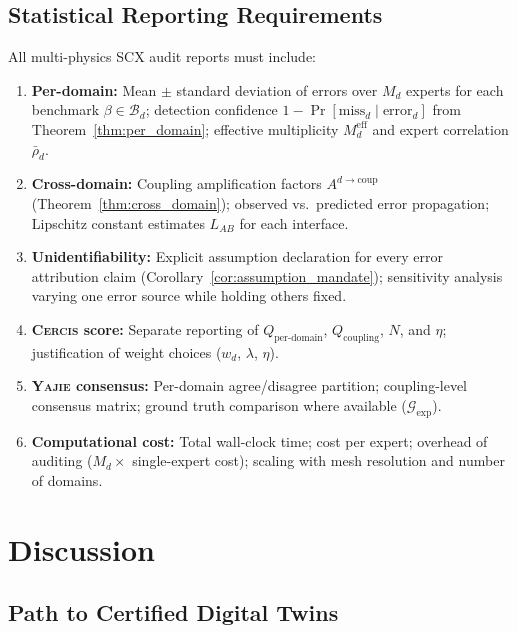 \documentclass[11pt,a4paper]{article}
\theoremstyle{definition}
\newcommand{\Yajie}{\textsc{Yajie}}
\newcommand{\Cercis}{\textsc{Cercis}}
\begin{document}
\subsection{Statistical Reporting Requirements }

All multi-physics SCX audit reports must include:

\begin{enumerate}[label=(\arabic*)]
    \item \textbf{Per-domain:} Mean $\pm$ standard deviation of errors over $M_d$ experts for each benchmark $\beta \in \mathcal{B}_d$; detection confidence $1 - \Pr[\text{miss}_d \mid \text{error}_d]$ from Theorem~\ref{thm:per_domain}; effective multiplicity $M_d^{\mathrm{eff}}$ and expert correlation $\bar{\rho}_d$.
    \item \textbf{Cross-domain:} Coupling amplification factors $A^{d \to \mathrm{coup}}$ (Theorem~\ref{thm:cross_domain}); observed vs.\ predicted error propagation; Lipschitz constant estimates $L_{AB}$ for each interface.
    \item \textbf{Unidentifiability:} Explicit assumption declaration for every error attribution claim (Corollary~\ref{cor:assumption_mandate}); sensitivity analysis varying one error source while holding others fixed.
    \item \textbf{\Cercis{} score:} Separate reporting of $Q_{\mathrm{per\text{-}domain}}$, $Q_{\mathrm{coupling}}$, $N$, and $\eta$; justification of weight choices ($w_d$, $\lambda$, $\eta$).
    \item \textbf{\Yajie{} consensus:} Per-domain agree/disagree partition; coupling-level consensus matrix; ground truth comparison where available ($\mathcal{G}_{\mathrm{exp}}$).
    \item \textbf{Computational cost:} Total wall-clock time; cost per expert; overhead of auditing ($M_d \times$ single-expert cost); scaling with mesh resolution and number of domains.
\end{enumerate}

\section{Discussion }
\label{sec:discussion}

\subsection{Path to Certified Digital Twins }
\end{document}
